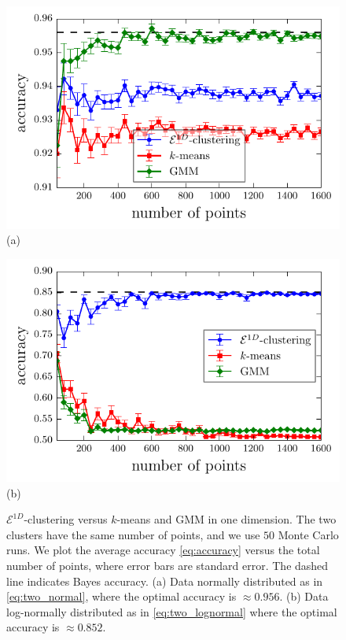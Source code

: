 \documentclass[aps,preprint,nofootinbib,floatfix]{revtex4-1}
\begin{document}
\begin{figure}
\begin{minipage}{0.49\textwidth}
\includegraphics[width=\textwidth]{1D_normal.pdf}\\[-1em](a)
\end{minipage}
\begin{minipage}{0.49\textwidth}
\includegraphics[width=\textwidth]{1D_lognormal.pdf}\\[-.8em](b)
\end{minipage}
\caption{
\label{fig:1d}
$\mathcal{E}^{1D}$-clustering versus $k$-means and GMM in one dimension.
The two clusters have the same number of points, and we use
$50$ Monte Carlo runs.
We plot the average 
accuracy \eqref{eq:accuracy} versus the total number of points, 
where error bars are standard error. The dashed line indicates 
Bayes accuracy. (a) Data normally distributed as in 
\eqref{eq:two_normal}, where the
optimal accuracy is $\approx 0.956$.
(b) Data log-normally distributed as in \eqref{eq:two_lognormal} where 
the optimal accuracy is $\approx 0.852$.
}
\end{figure}
\end{document}
